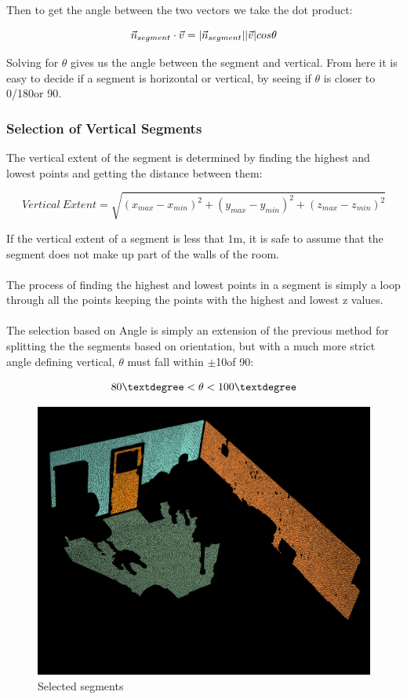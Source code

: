 			Then to get the angle between the two vectors we take the dot product:
			
			\begin{equation}
			\vec{n}_{segment}\cdot \vec{v} = \lvert \vec{n}_{segment} \rvert \lvert \vec{v} \rvert cos \theta
			\end{equation}
			
			Solving for $\theta$ gives us the angle between the segment and vertical. From here it is easy to decide if a segment is horizontal or vertical, by seeing if $\theta$ is closer to 0\textdegree/180\textdegree or 90\textdegree.
			
		\subsubsection{Selection of Vertical Segments}
			
			The vertical extent of the segment is determined by finding the highest and lowest points and getting the distance between them:
			
			\begin{equation}
			Vertical \: Extent = \sqrt{(x_{max} - x_{min})^2+(y_{max} - y_{min})^2+(z_{max} - z_{min})^2}
			\end{equation}
			
			If the vertical extent of a segment is less that 1m, it is safe to assume that the segment does not make up part of the walls of the room.\\
			\\
			The process of finding the highest and lowest points in a segment is simply a loop through all the points keeping the points with the highest and lowest z values.\\
			\\
			The selection based on Angle is simply an extension of the previous method for splitting the the segments based on orientation, but with a much more strict angle defining vertical, $\theta$ must fall within $\pm$10\textdegree of 90\textdegree:
			
			\begin{equation}
			80\textdegree < \theta < 100\textdegree
			\end{equation}
			\begin{figure}[H]
				\centering
				\includegraphics[width=0.7\linewidth]{"Includes/images/Selected segments"}
				\caption{Selected segments}
				\label{fig:Selectedsegments}
			\end{figure}
			
					
